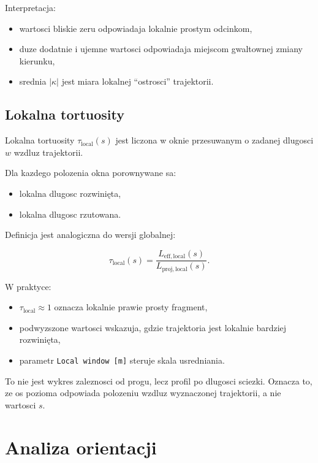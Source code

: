\documentclass[11pt,a4paper]{article}
\begin{document}
Interpretacja:

\begin{itemize}[leftmargin=1.5em]
    \item wartosci bliskie zeru odpowiadaja lokalnie prostym odcinkom,
    \item duze dodatnie i ujemne wartosci odpowiadaja miejscom gwaltownej
    zmiany kierunku,
    \item srednia \(|\kappa|\) jest miara lokalnej ``ostrosci'' trajektorii.
\end{itemize}

\subsection{Lokalna tortuosity}

Lokalna tortuosity \(\tau_{\mathrm{local}}(s)\) jest liczona w oknie
przesuwanym o zadanej dlugosci \(w\) wzdluz trajektorii.

Dla kazdego polozenia okna porownywane sa:

\begin{itemize}[leftmargin=1.5em]
    \item lokalna dlugosc rozwinięta,
    \item lokalna dlugosc rzutowana.
\end{itemize}

Definicja jest analogiczna do wersji globalnej:

\begin{equation}
    \tau_{\mathrm{local}}(s) =
    \frac{L_{\mathrm{eff,local}}(s)}{L_{\mathrm{proj,local}}(s)}.
\end{equation}

W praktyce:

\begin{itemize}[leftmargin=1.5em]
    \item \(\tau_{\mathrm{local}} \approx 1\) oznacza lokalnie prawie prosty
    fragment,
    \item podwyzszone wartosci wskazuja, gdzie trajektoria jest lokalnie
    bardziej rozwinięta,
    \item parametr \texttt{Local window [\textmu m]} steruje skala usredniania.
\end{itemize}

To nie jest wykres zaleznosci od progu, lecz profil po dlugosci sciezki.
Oznacza to, ze os pozioma odpowiada polozeniu wzdluz wyznaczonej trajektorii,
a nie wartosci \(s\).

\section{Analiza orientacji}
\end{document}
